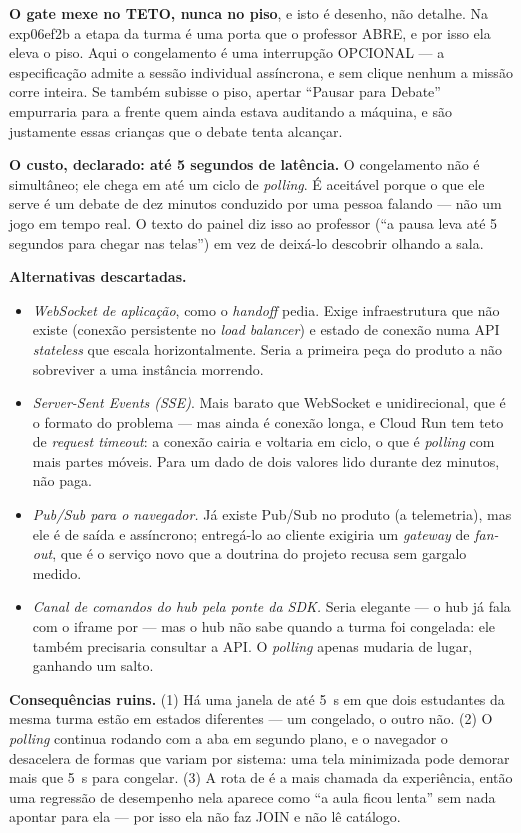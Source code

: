 \textbf{O gate mexe no TETO, nunca no piso}, e isto é desenho, não detalhe. Na
exp06ef2b a etapa da turma é uma porta que o professor ABRE, e por isso ela eleva o
piso. Aqui o congelamento é uma interrupção OPCIONAL --- a especificação admite
a sessão individual assíncrona, e sem clique nenhum a missão corre inteira. Se
 também subisse o piso, apertar \enquote{Pausar para Debate}
empurraria para a frente quem ainda estava auditando a máquina, e são justamente
essas crianças que o debate tenta alcançar.

\textbf{O custo, declarado: até 5 segundos de latência.} O congelamento não é
simultâneo; ele chega em até um ciclo de \emph{polling}. É aceitável porque o
que ele serve é um debate de dez minutos conduzido por uma pessoa falando ---
não um jogo em tempo real. O texto do painel diz isso ao professor
(\enquote{a pausa leva até 5 segundos para chegar nas telas}) em vez de deixá-lo
descobrir olhando a sala.

\textbf{Alternativas descartadas.}
\begin{itemize}
  \item \emph{WebSocket de aplicação}, como o \emph{handoff} pedia. Exige
    infraestrutura que não existe (conexão persistente no \emph{load balancer})
    e estado de conexão numa API \emph{stateless} que escala horizontalmente.
    Seria a primeira peça do produto a não sobreviver a uma instância morrendo.
  \item \emph{Server-Sent Events (SSE)}. Mais barato que WebSocket e unidirecional,
    que é o formato do problema --- mas ainda é conexão longa, e Cloud Run tem
    teto de \emph{request timeout}: a conexão cairia e voltaria em ciclo, o que
    é \emph{polling} com mais partes móveis. Para um dado de dois valores lido
    durante dez minutos, não paga.
  \item \emph{Pub/Sub para o navegador.} Já existe Pub/Sub no produto (a
    telemetria), mas ele é de saída e assíncrono; entregá-lo ao cliente exigiria
    um \emph{gateway} de \emph{fan-out}, que é o serviço novo que a doutrina do
    projeto recusa sem gargalo medido.
  \item \emph{Canal de comandos do hub pela ponte da SDK.} Seria elegante --- o
    hub já fala com o iframe por  --- mas o hub não sabe quando a
    turma foi congelada: ele também precisaria consultar a API. O \emph{polling}
    apenas mudaria de lugar, ganhando um salto.
\end{itemize}

\textbf{Consequências ruins.} (1) Há uma janela de até 5~s em que dois
estudantes da mesma turma estão em estados diferentes --- um congelado, o outro
não. (2) O \emph{polling} continua rodando com a aba em segundo plano, e o
navegador o desacelera de formas que variam por sistema: uma tela minimizada
pode demorar mais que 5~s para congelar. (3) A rota de  é a mais
chamada da experiência, então uma regressão de desempenho nela aparece como
\enquote{a aula ficou lenta} sem nada apontar para ela --- por isso ela não faz
JOIN e não lê catálogo.

